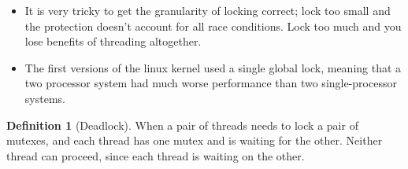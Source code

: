 \documentclass[11pt, a4paper]{article}
\theoremstyle{definition}
\newtheorem{definition}[theorem]{Definition}
\theoremstyle{remark}
\begin{document}
\begin{itemize}
\begin{cppcode}
struct empty_stack : std::exception {
    const char* what() const noexcept;    
};
template <typename T>
class threadsafe_stack {
public:
    threadsafe_stack();
    threadsafe_stack(const threadsafe_stack&);
    threadsafe_stack& operator=(const threadsafe_stack&) = delete;
    void push(T new_value);
    std::shared_ptr<T> pop();
    void pop(T& value);
    bool empty() const;
};
\end{cppcode}
    \item It is very tricky to get the granularity of locking correct; lock too small and the protection doesn't account for all race conditions. Lock too much and you lose benefits of threading altogether.
    \item The first versions of the linux kernel used a single global lock, meaning that a two processor system had much worse performance than two single-processor systems.
\end{itemize}
\begin{definition}[Deadlock]
    When a pair of threads needs to lock a pair of mutexes, and each thread has one mutex and is waiting for the other. Neither thread can proceed, since each thread is waiting on the other.
\end{definition}
\end{document}
